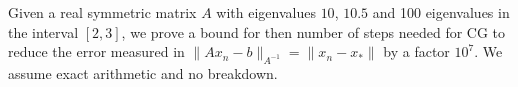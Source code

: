 

Given a real symmetric matrix $A$ with eigenvalues $10$, $10.5$ and 100 eigenvalues in the interval $[2,3]$, we prove a bound for then number of steps needed for CG to reduce the error measured in $\|Ax_n-b\|_{A^{-1}} = \|x_n-x_*\|$ by a factor $10^7$. We assume exact arithmetic and no breakdown. 


